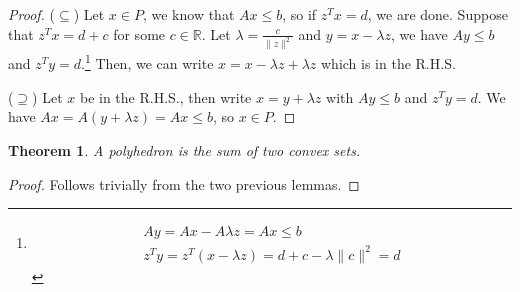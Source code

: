 \documentclass{tufte-handout}
\newtheorem{thm}{Theorem}
\theoremstyle{definition}
\theoremstyle{remark}
\newcommand{\norm}[1]{\lVert #1 \rVert}
\newcommand{\R}{\mathbb{R}}
\begin{document}
\begin{proof}
	($\subseteq$) Let $x \in P$, we know that $Ax \leq b$, so if $z^Tx = d$, we are done. Suppose that $z^Tx = d+ c$ for some $c \in \R$. Let $\lambda = \frac{c}{\norm{z}^2}$ and $y=x-\lambda z$, we have $Ay\leq b$ and $z^Ty = d$.\footnote{\begin{align*}
			Ay  = Ax - A\lambda z = Ax\leq b\\
			z^Ty = z^T(x-\lambda z) = d+c - \lambda \norm{c}^2 = d
			\end{align*}}
	Then, we can write $x = x-\lambda z + \lambda z$ which is in the R.H.S.
	
	($\supseteq$) Let $x$ be in the R.H.S., then write $x = y+\lambda z$ with $Ay \leq b$ and $z^Ty = d$. We have $Ax = A(y+\lambda z) = Ax \leq b$, so $x \in P$.
\end{proof}
\begin{thm}
	A polyhedron is the sum of two convex sets.
\end{thm}
\begin{proof}
	Follows trivially from the two previous lemmas.
\end{proof}
\end{document}
